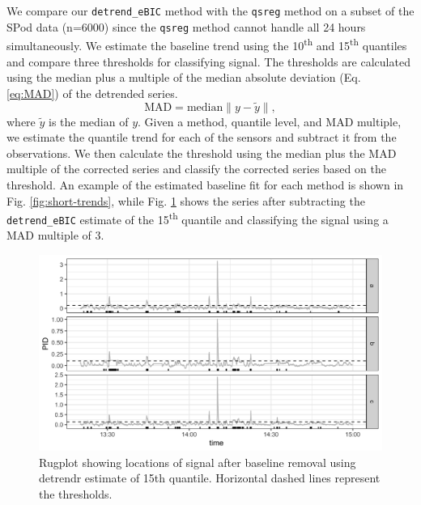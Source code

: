 \documentclass[12pt]{article}
\begin{document}
	We compare our \texttt{detrend\_eBIC} method with the \texttt{qsreg} method on a subset of the SPod data (n=6000) since the \texttt{qsreg} method cannot handle all 24 hours simultaneously. We estimate the baseline trend using the 10\textsuperscript{th} and 15\textsuperscript{th} quantiles and compare three thresholds for classifying signal. The thresholds are calculated using the median plus a multiple of the median absolute deviation (Eq. \ref{eq:MAD}) of the detrended series. 
	\begin{equation}
	\label{eq:MAD}
	\mbox{MAD} = \mbox{median}\lVert y-\tilde{y}\rVert,
	\end{equation}
	where $\tilde{y}$ is the median of $y$. Given a method, quantile level, and MAD multiple, we estimate the quantile trend for each of the sensors and subtract it from the observations. We then calculate the threshold using the median plus the MAD multiple of the corrected series and classify the corrected series based on the threshold. An example of the estimated baseline fit for each method is shown in Fig. \ref{fig:short-trends}, while Fig. \ref{fig:rugplot} shows the series after subtracting the \texttt{detrend\_eBIC} estimate of the 15\textsuperscript{th} quantile and classifying the signal using a MAD multiple of 3. 
	 
 	\begin{figure}
	 	\includegraphics[width = \linewidth]{Figures/corrected_rugplot.png}
	 	\caption{Rugplot showing locations of signal after baseline removal using detrendr estimate of 15th quantile. Horizontal dashed lines represent the thresholds.}
	 	\label{fig:rugplot}
	 \end{figure}
	 
\end{document}

